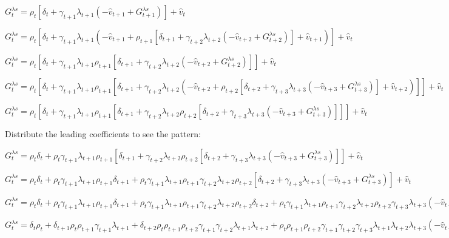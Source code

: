 \documentclass[11pt]{article}
\begin{document}
    \noindent $ G_{t}^{\lambda s} = \rho_{t} [ \delta_{t} + \gamma_{t+1} \lambda_{t+1} ( - \hat{v}_{t+1} + G_{t+1}^{\lambda s})  ] + \hat{v}_{t} $

    \noindent $ G_{t}^{\lambda s} = \rho_{t} [ \delta_{t} + \gamma_{t+1} \lambda_{t+1} ( - \hat{v}_{t+1} +  \rho_{t+1} [ \delta_{t+1} + \gamma_{t+2} \lambda_{t+2} ( - \hat{v}_{t+2} + G_{t+2}^{\lambda s})  ] + \hat{v}_{t+1} )  ] + \hat{v}_{t} $

    \noindent $ G_{t}^{\lambda s} = \rho_{t} [ \delta_{t} + \gamma_{t+1} \lambda_{t+1} \rho_{t+1} [ \delta_{t+1} + \gamma_{t+2} \lambda_{t+2} ( - \hat{v}_{t+2} + G_{t+2}^{\lambda s})  ]  ] + \hat{v}_{t} $

    \noindent $ G_{t}^{\lambda s} = \rho_{t} [ \delta_{t} + \gamma_{t+1} \lambda_{t+1} \rho_{t+1} [ \delta_{t+1} + \gamma_{t+2} \lambda_{t+2} ( - \hat{v}_{t+2} + \rho_{t+2} [ \delta_{t+2} + \gamma_{t+3} \lambda_{t+3} ( - \hat{v}_{t+3} + G_{t+3}^{\lambda s})  ] + \hat{v}_{t+2} )  ]  ] + \hat{v}_{t} $

    \noindent $ G_{t}^{\lambda s} = \rho_{t} [ \delta_{t} + \gamma_{t+1} \lambda_{t+1} \rho_{t+1} [ \delta_{t+1} + \gamma_{t+2} \lambda_{t+2} \rho_{t+2} [ \delta_{t+2} + \gamma_{t+3} \lambda_{t+3} ( - \hat{v}_{t+3} + G_{t+3}^{\lambda s})  ]  ]  ] + \hat{v}_{t} $

    \hfill \break
    \noindent Distribute the leading coefficients to see the pattern:

    \noindent $ G_{t}^{\lambda s} = \rho_{t} \delta_{t} + \rho_{t} \gamma_{t+1} \lambda_{t+1} \rho_{t+1} [ \delta_{t+1} + \gamma_{t+2} \lambda_{t+2} \rho_{t+2} [ \delta_{t+2} + \gamma_{t+3} \lambda_{t+3} ( - \hat{v}_{t+3} + G_{t+3}^{\lambda s})  ]  ]  + \hat{v}_{t} $

    \noindent $ G_{t}^{\lambda s} = \rho_{t} \delta_{t} + \rho_{t} \gamma_{t+1} \lambda_{t+1} \rho_{t+1} \delta_{t+1} + \rho_{t} \gamma_{t+1} \lambda_{t+1} \rho_{t+1} \gamma_{t+2} \lambda_{t+2} \rho_{t+2} [ \delta_{t+2} + \gamma_{t+3} \lambda_{t+3} ( - \hat{v}_{t+3} + G_{t+3}^{\lambda s})  ]   + \hat{v}_{t} $

    \noindent $ G_{t}^{\lambda s} = \rho_{t} \delta_{t} + \rho_{t} \gamma_{t+1} \lambda_{t+1} \rho_{t+1} \delta_{t+1} + \rho_{t} \gamma_{t+1} \lambda_{t+1} \rho_{t+1} \gamma_{t+2} \lambda_{t+2} \rho_{t+2} \delta_{t+2} + \rho_{t} \gamma_{t+1} \lambda_{t+1} \rho_{t+1} \gamma_{t+2} \lambda_{t+2} \rho_{t+2} \gamma_{t+3} \lambda_{t+3} ( - \hat{v}_{t+3} + G_{t+3}^{\lambda s})   + \hat{v}_{t} $

    \noindent $ G_{t}^{\lambda s} = \delta_{t} \rho_{t} + \delta_{t+1} \rho_{t} \rho_{t+1} \gamma_{t+1} \lambda_{t+1} + \delta_{t+2} \rho_{t} \rho_{t+1} \rho_{t+2} \gamma_{t+1} \gamma_{t+2} \lambda_{t+1} \lambda_{t+2} + \rho_{t} \rho_{t+1} \rho_{t+2} \gamma_{t+1} \gamma_{t+2} \gamma_{t+3} \lambda_{t+1} \lambda_{t+2} \lambda_{t+3} ( - \hat{v}_{t+3} + G_{t+3}^{\lambda s})   + \hat{v}_{t} $
\end{document}
